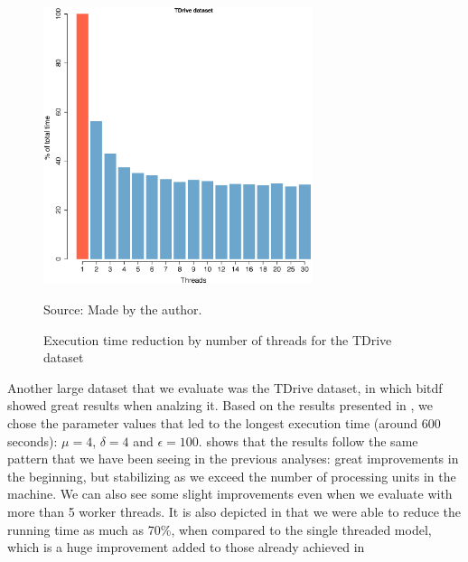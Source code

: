 {\begin{figure}[h!]
    \centering
    \caption{Execution time reduction by number of threads for the TDrive dataset}
    \centerline{\includegraphics[width=0.7\textwidth]{images/TDrive_thread.eps}}
    \footnotesize{Source: Made by the author.}
    \label{fig:tdrive_threads}
\end{figure}

Another large dataset that we evaluate was the TDrive dataset, in which \ac{bitdf} showed great results when analzing
it. Based on the results presented in , we chose the parameter values that led to the longest
execution time (around 600 seconds): $\mu=4$, $\delta=4$ and $\epsilon=100$.  shows that the
results follow the same pattern that we have been seeing in the previous analyses: great improvements in the beginning,
but stabilizing as we exceed the number of processing units in the machine. We can also see some slight improvements
even when we evaluate with more than 5 worker threads. It is also depicted in  that we were
able to reduce the running time as much as 70\%, when compared to the single threaded model, which is a huge improvement
added to those already achieved in 

}
